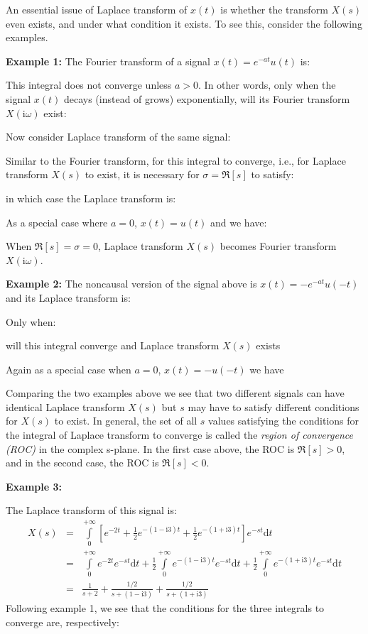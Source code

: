 	An essential issue of Laplace transform of $x(t)$ is whether the transform $X(s)$
	even exists, and under what condition it exists. To see this, consider the 
	following examples.
	
	{\bf Example 1:} The Fourier transform of a signal $x(t)=e^{-at}u(t)$ is:
	
	This integral does not converge unless $a>0$. In other words, only when the signal $x(t)$ decays (instead of grows) exponentially, will its Fourier transform  $X(\mathrm{i}\omega)$ exist:
	
	
	Now consider Laplace transform of the same signal:
	
	Similar to the Fourier transform, for this integral to converge, i.e., for Laplace transform $X(s)$ to exist, it is necessary for $\sigma=\Re[s]$ to satisfy:
	
	in which case the Laplace transform is:
	
	As a special case where $a=0$, $x(t)=u(t)$ and we have:
	
	
	When $ \Re[s]=\sigma=0$, Laplace transform $X(s)$ becomes Fourier transform $X(\mathrm{i}\omega)$.  
	
	\vskip 0.2in
	{\bf Example 2:} The noncausal version of the signal above is $x(t)=-e^{-at}u(-t)$ and its Laplace transform is:
	
	Only when:
	
	will this integral converge and Laplace transform $X(s)$ exists
	
	Again as a special case when $a=0$, $x(t)=-u(-t)$ we have
	
	Comparing the two examples above we see that two different signals can have
	identical Laplace transform $X(s)$ but $s$ may have to satisfy different 
	conditions for $X(s)$ to exist. In general, the set of all $s$ values 
	satisfying the conditions for the integral of Laplace transform to converge 
	is called the {\em region of convergence (ROC)} in the complex s-plane. In 
	the first case above, the ROC is $\Re[s]>0$, and in the second case, the ROC
	is $\Re[s]<0$.
	
	{\bf Example 3:} 
	
	The Laplace transform of this signal is:
	\begin{eqnarray}
	X(s) & = & \int\limits_0^{+\infty} [e^{-2t}+\frac{1}{2}e^{-(1-\mathrm{i}3)t}
		+\frac{1}{2}e^{-(1+\mathrm{i}3)t}]e^{-st} \mathrm{d}t	\nonumber \\
	&=& \int\limits_0^{+\infty} e^{-2t}e^{-st} \mathrm{d}t
		+\frac{1}{2}\int\limits_0^{+\infty} e^{-(1-\mathrm{i}3)t}e^{-st} \mathrm{d}t
		+\frac{1}{2}\int\limits_0^{+\infty} e^{-(1+\mathrm{i}3)t}e^{-st} \mathrm{d}t
	\nonumber \\
	&=& \frac{1}{s+2}+\frac{1/2}{s+(1-\mathrm{i}3)}+\frac{1/2}{s+(1+\mathrm{i}3)}
	\nonumber
	\end{eqnarray}
	Following example 1, we see that the conditions for the three integrals to converge are, respectively:
	
